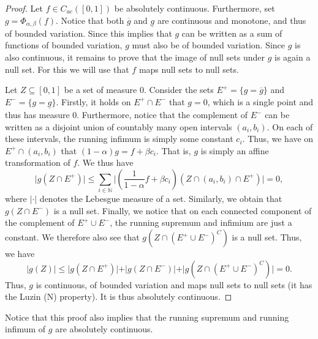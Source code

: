 \documentclass[11pt]{article}
\theoremstyle{remark}
\newcommand{\N}{\mathbb{N}}
\begin{document}
\begin{proof}
    Let $f\in C_{ac}([0,1])$ be absolutely continuous. Furthermore, set $g=\Phi_{\alpha,\beta}(f).$ Notice that both $\overline{g}$ and $\underline{g}$ are continuous and monotone, and thus of bounded variation. Since this implies that $g$ can be written as a sum of functions of bounded variation, $g$ must also be of bounded variation. Since $g$ is also continuous, it remains to prove that the image of null sets under $g$ is again a null set. For this we will use that $f$ maps null sets to null sets.

    Let $Z\subseteq[0,1]$ be a set of measure $0$. Consider the sets $E^+=\{g=\overline{g}\}$ and $E^-=\{g=\underline{g}\}$. Firstly, it holds on $E^+\cap E^-$ that $g=0$, which is a single point and thus has measure $0$. Furthermore, notice that the complement of $E^-$ can be written as a disjoint union of countably many open intervals $(a_i,b_i)$. On each of these intervals, the running infimum is simply some constant $c_i$. Thus, we have on $E^+\cap(a_i,b_i)$ that $(1-\alpha)g=f+\beta c_i$. That is, $g$ is simply an affine transformation of $f$. We thus have
    $$\vert g(Z\cap E^+)\vert\leq\sum_{i\in\N}\vert(\frac{1}{1-\alpha}f+\beta c_i)(Z\cap (a_i,b_i)\cap E^+)\vert=0,$$
    where $\vert\cdot\vert$ denotes the Lebesgue measure of a set. Similarly, we obtain that $g(Z\cap E^-)$ is a null set. Finally, we notice that on each connected component of the complement of $E^+\cup E^-$, the running supremum and infimium are just a constant. We therefore also see that $g(Z\cap(E^+\cup E^-)^C)$ is a null set. Thus, we have
    $$\vert g(Z)\vert\leq \vert g(Z\cap E^+)\vert+\vert g(Z\cap E^-)\vert+\vert g(Z\cap (E^+\cup E^-)^C)\vert=0.$$
    Thus, $g$ is continuous, of bounded variation and maps null sets to null sets (it has the Luzin (N) property). It is thus absolutely continuous.
\end{proof}
Notice that this proof also implies that the running supremum and running infimum of $g$ are absolutely continuous.
\end{document}
